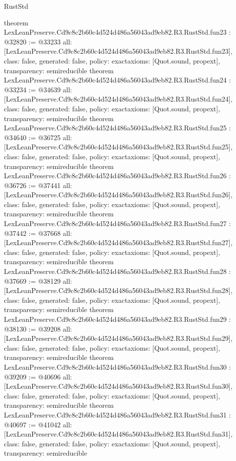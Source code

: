 \begin{lexlean}{RustStd}
\begin{coremodule}
{}
theorem LexLeanPreserve.Cd9c8c2b60c4d524d486a56043ad9eb82.R3.RustStd.fun23 : @32820 := @33233 {
  all: [LexLeanPreserve.Cd9c8c2b60c4d524d486a56043ad9eb82.R3.RustStd.fun23],
  class: false,
  generated: false,
  policy: exact{axioms: [Quot.sound, propext]},
  transparency: semireducible
}
theorem LexLeanPreserve.Cd9c8c2b60c4d524d486a56043ad9eb82.R3.RustStd.fun24 : @33234 := @34639 {
  all: [LexLeanPreserve.Cd9c8c2b60c4d524d486a56043ad9eb82.R3.RustStd.fun24],
  class: false,
  generated: false,
  policy: exact{axioms: [Quot.sound, propext]},
  transparency: semireducible
}
theorem LexLeanPreserve.Cd9c8c2b60c4d524d486a56043ad9eb82.R3.RustStd.fun25 : @34640 := @36725 {
  all: [LexLeanPreserve.Cd9c8c2b60c4d524d486a56043ad9eb82.R3.RustStd.fun25],
  class: false,
  generated: false,
  policy: exact{axioms: [Quot.sound, propext]},
  transparency: semireducible
}
theorem LexLeanPreserve.Cd9c8c2b60c4d524d486a56043ad9eb82.R3.RustStd.fun26 : @36726 := @37441 {
  all: [LexLeanPreserve.Cd9c8c2b60c4d524d486a56043ad9eb82.R3.RustStd.fun26],
  class: false,
  generated: false,
  policy: exact{axioms: [Quot.sound, propext]},
  transparency: semireducible
}
theorem LexLeanPreserve.Cd9c8c2b60c4d524d486a56043ad9eb82.R3.RustStd.fun27 : @37442 := @37668 {
  all: [LexLeanPreserve.Cd9c8c2b60c4d524d486a56043ad9eb82.R3.RustStd.fun27],
  class: false,
  generated: false,
  policy: exact{axioms: [Quot.sound, propext]},
  transparency: semireducible
}
theorem LexLeanPreserve.Cd9c8c2b60c4d524d486a56043ad9eb82.R3.RustStd.fun28 : @37669 := @38129 {
  all: [LexLeanPreserve.Cd9c8c2b60c4d524d486a56043ad9eb82.R3.RustStd.fun28],
  class: false,
  generated: false,
  policy: exact{axioms: [Quot.sound, propext]},
  transparency: semireducible
}
theorem LexLeanPreserve.Cd9c8c2b60c4d524d486a56043ad9eb82.R3.RustStd.fun29 : @38130 := @39208 {
  all: [LexLeanPreserve.Cd9c8c2b60c4d524d486a56043ad9eb82.R3.RustStd.fun29],
  class: false,
  generated: false,
  policy: exact{axioms: [Quot.sound, propext]},
  transparency: semireducible
}
theorem LexLeanPreserve.Cd9c8c2b60c4d524d486a56043ad9eb82.R3.RustStd.fun30 : @39209 := @40696 {
  all: [LexLeanPreserve.Cd9c8c2b60c4d524d486a56043ad9eb82.R3.RustStd.fun30],
  class: false,
  generated: false,
  policy: exact{axioms: [Quot.sound, propext]},
  transparency: semireducible
}
theorem LexLeanPreserve.Cd9c8c2b60c4d524d486a56043ad9eb82.R3.RustStd.fun31 : @40697 := @41042 {
  all: [LexLeanPreserve.Cd9c8c2b60c4d524d486a56043ad9eb82.R3.RustStd.fun31],
  class: false,
  generated: false,
  policy: exact{axioms: [Quot.sound, propext]},
  transparency: semireducible
}
\end{coremodule}
\end{lexlean}
